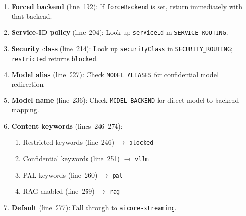 \documentclass[11pt]{article}
\begin{document}
\begin{enumerate}
  \item \textbf{Forced backend} (line~192): If \texttt{forceBackend} is set,
        return immediately with that backend.
  \item \textbf{Service-ID policy} (line~204): Look up \texttt{serviceId} in
        \texttt{SERVICE\_ROUTING}.
  \item \textbf{Security class} (line~214): Look up \texttt{securityClass} in
        \texttt{SECURITY\_ROUTING}; \texttt{restricted} returns \texttt{blocked}.
  \item \textbf{Model alias} (line~227): Check \texttt{MODEL\_ALIASES} for
        confidential model redirection.
  \item \textbf{Model name} (line~236): Check \texttt{MODEL\_BACKEND} for
        direct model-to-backend mapping.
  \item \textbf{Content keywords} (lines~246--274):
    \begin{enumerate}
      \item Restricted keywords (line~246) $\rightarrow$ \texttt{blocked}
      \item Confidential keywords (line~251) $\rightarrow$ \texttt{vllm}
      \item PAL keywords (line~260) $\rightarrow$ \texttt{pal}
      \item RAG enabled (line~269) $\rightarrow$ \texttt{rag}
    \end{enumerate}
  \item \textbf{Default} (line~277): Fall through to \texttt{aicore-streaming}.
\end{enumerate}
\end{document}
